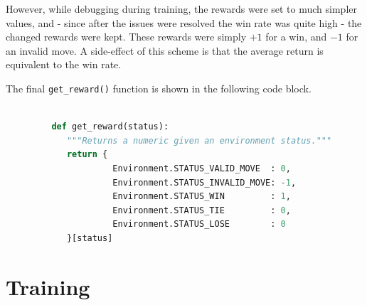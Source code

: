 \documentclass{article}
\begin{document}
   However, while debugging during training, the rewards were set to much simpler values, and - since
   after the issues were resolved the win rate was quite high - the changed rewards were kept. These rewards
   were simply $+1$ for a win, and $-1$ for an invalid move.
   A side-effect of this scheme is that the average return is equivalent to the win rate.

   The final \texttt{get\_reward()} function is shown in the following code block.
      \begin{lstlisting}[language=Python, label={reward}]

         def get_reward(status):
            """Returns a numeric given an environment status."""
            return {
                     Environment.STATUS_VALID_MOVE  : 0,
                     Environment.STATUS_INVALID_MOVE: -1,
                     Environment.STATUS_WIN         : 1,
                     Environment.STATUS_TIE         : 0,
                     Environment.STATUS_LOSE        : 0
            }[status]
      \end{lstlisting}


   \section{Training}
\end{document}
